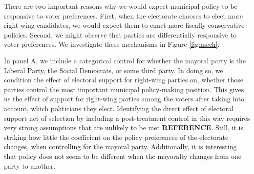 \documentclass[a4paper,12pt]{article}
\begin{document}
There are two important reasons why we would expect municipal policy to be responsive to voter preferences. First, when the electorate chooses to elect more right-wing candidates, we would expect them to enact more fiscally conservative policies. Second, we might observe that parties are differentially responsive to voter preferences. We investigate these mechanisms in Figure \ref{fig:mech}.

In panel A, we include a categorical control for whether the mayoral party is the Liberal Party, the Social Democrats, or some third party.  In doing so, we condition the effect of electoral support for right-wing parties on, whether those parties control the most important municipal policy-making position. This gives us the effect of support for right-wing parties among the voters after taking into account, which politicians they elect. Identifying the direct effect of electoral support net of selection by including a post-treatment control in this way requires very strong assumptions that are unlikely to be met \textbf{REFERENCE}. Still, it is striking how little the coefficient on the policy preferences of the electorate changes, when controlling for the mayoral party. Additionally, it is interesting that policy does not seem to be different when the mayoralty changes from one party to another.
\end{document}
